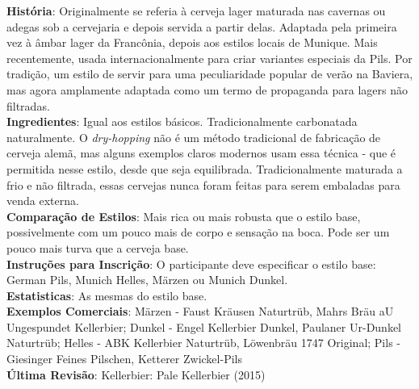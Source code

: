 \textbf{História}: Originalmente se referia à cerveja lager maturada nas cavernas ou adegas sob a cervejaria e depois servida a partir delas. Adaptada pela primeira vez à âmbar lager da Francônia, depois aos estilos locais de Munique. Mais recentemente, usada internacionalmente para criar variantes especiais da Pils. Por tradição, um estilo de servir para uma peculiaridade popular de verão na Baviera, mas agora amplamente adaptada como um termo de propaganda para lagers não filtradas. \\
\textbf{Ingredientes}: Igual aos estilos básicos. Tradicionalmente carbonatada naturalmente. O \textit{dry-hopping} não é um método tradicional de fabricação de cerveja alemã, mas alguns exemplos claros modernos usam essa técnica - que é permitida nesse estilo, desde que seja equilibrada. Tradicionalmente maturada a frio e não filtrada, essas cervejas nunca foram feitas para serem embaladas para venda externa. \\
\textbf{Comparação de Estilos}: Mais rica ou mais robusta que o estilo base, possivelmente com um pouco mais de corpo e sensação na boca. Pode ser um pouco mais turva que a cerveja base. \\
\textbf{Instruções para Inscrição}: O participante deve especificar o estilo base: German Pils, Munich Helles, Märzen ou Munich Dunkel. \\
\textbf{Estatisticas}: As mesmas do estilo base. \\
\textbf{Exemplos Comerciais}: Märzen - Faust Kräusen Naturtrüb, Mahrs Bräu aU Ungespundet Kellerbier; Dunkel - Engel Kellerbier Dunkel, Paulaner Ur-Dunkel Naturtrüb; Helles - ABK Kellerbier Naturtrüb, Löwenbräu 1747 Original; Pils - Giesinger Feines Pilschen, Ketterer Zwickel-Pils \\
\textbf{Última Revisão}: Kellerbier: Pale Kellerbier (2015) \\
